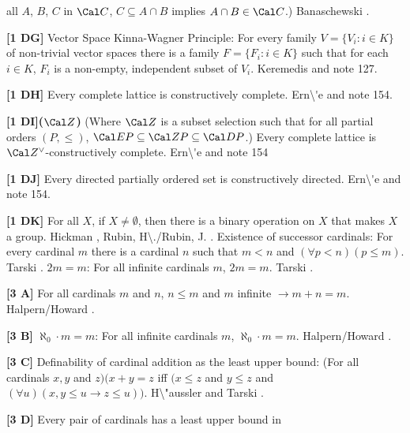 all $A$, $B$, $C$ in $\Cal C$, $C\subseteq A\cap B$ implies $A\cap B\in
\Cal C$.) \ac{Banaschewski} \cite{1961}.
\smallskip
\item{}{\bf [1 DG]} Vector Space Kinna-Wagner Principle:  For
every family $V = \{V_i : i \in K\}$ of non-trivial vector spaces there is
a family $F = \{F_i : i\in K\}$ such that for each $i\in K$, $F_i$ is a
non-empty, independent subset of $V_i$. \ac{Keremedis} \cite{2001a} and
note 127. %
\smallskip 
\item{}{\bf [1 DH]} Every complete lattice is constructively
complete.  \ac{Ern\'e} \cite{2000} and note 154.
\smallskip
\item{}{\bf [1 DI]($\Cal Z$)} (Where $\Cal Z$ is a subset selection
such that for all partial orders $(P,\le)$, $\Cal E P\subseteq \Cal
Z P\subseteq \Cal D P$.) Every complete lattice is $\Cal
Z^\lor$-constructively complete.  \ac{Ern\'e} \cite{2000} and note
154
\smallskip
\item{}{\bf [1 DJ]} Every directed partially ordered set is
constructively directed.  \ac{Ern\'e} \cite{2000} and note 154.
 
\smallskip
\item{}{\bf [1 DK]} For all $X$, if $X\neq\emptyset$, then there is a
binary operation on $X$ that makes $X$ a group.  \ac{Hickman} \cite{1976},
\ac{Rubin, H\./Rubin, J.} \cite{1985 p.110, AL14}.
\medskip
{} Existence of successor cardinals: For every cardinal
$m$ there is a cardinal $n$ such that $m < n$ and $(\forall p < n)(p \le
m)$.  \ac{Tarski} \cite{1954a}.
\medskip
{} $2m = m$: For all infinite cardinals $m$, $2m = m$.
\ac{Tarski} \cite{1954a}.
\smallskip
\item{}{\bf [3 A]} For all cardinals $m$ and $n$, $n\le m$ and $m$
infinite $\rightarrow m + n = m$.  \ac{Halpern/Howard} \cite{1970}.
\smallskip
\item{}{\bf [3 B]} $\aleph_{0}\cdot m = m$:  For all infinite cardinals
$m$, $\aleph_{0}\cdot m  =  m$.  \ac{Halpern/Howard} \cite{1970}.
\smallskip
\item{}{\bf [3 C]}  Definability of cardinal addition as the least upper
bound: (For all cardinals $x, y$ and $z)( x + y = z$ iff $( x \le  z$
and $y \le  z$ and $(\forall  u)( x,y \le  u \rightarrow  z \le  u))$.
\ac{H\"aussler}  \cite{1983} and \ac{Tarski} \cite{1949a}.
\smallskip
\item{}{\bf [3 D]}  Every pair of cardinals has a least upper bound in
